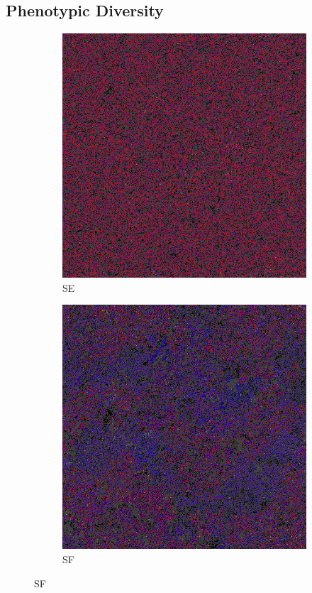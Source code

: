 \subsection{Phenotypic Diversity} 



\begin{figure}
\begin{subfigure}{.25\textwidth}
  \centering
  \includegraphics[width=.9\linewidth]{img/stable495000}
  \caption{SE}
\end{subfigure}%
\begin{subfigure}{.25\textwidth}
  \centering
  \includegraphics[width=.9\linewidth]{img/var495000}
  \caption{SF}
\end{subfigure}


\end{figure}
